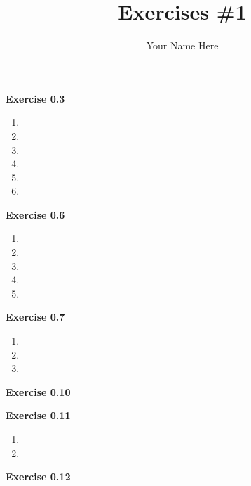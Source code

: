 \documentclass{article}
\title{Exercises \#1}
\author{Your Name Here}
\makeatletter
\newcommand\exercise[1]{\par\vspace{4ex}\normalfont\normalsize\noindent
\textbf{\large Exercise #1}\par\nobreak\@afterindentfalse\@afterheading}
\makeatother
\begin{document}
\maketitle

\exercise{0.3}
\begin{enumerate}
\item
\item
\item
\item
\item
\item
\end{enumerate}

\exercise{0.6}
\begin{enumerate}
\item
\item
\item
\item
\item
\end{enumerate}

\exercise{0.7}
\begin{enumerate}
\item
\item
\item
\end{enumerate}

\exercise{0.10}

\exercise{0.11}
\begin{enumerate}
\item
\item
\end{enumerate}

\exercise{0.12}
\end{document}
